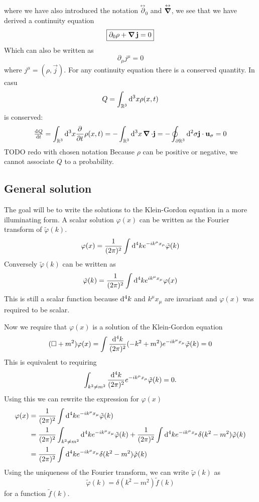 where we have also introduced the notation $\overset{\leftrightarrow}{\partial}_0$ and $\overset{\leftrightarrow}{\operatorname{\boldsymbol{\mathrm{\nabla}}}}$, we see that we have derived a continuity equation
\[ \boxed{\partial_0\rho + \operatorname{\boldsymbol{\mathrm{\nabla}}}\boldsymbol{\mathrm{j}}=0}\]
Which can also be written as
\[ \partial_\mu j^\mu =0 \]
where $j^\mu = (\rho,\vec{j})$. For any continuity equation there is a conserved quantity. In casu
\[ Q = \int_{\mathbb{R}^3}\operatorname{d \!}{^3x}\rho(x,t) \]
is conserved:
\[ \od{Q}{t} = \int_{\R^3} \diff{^3x}\pd{}{t}\rho(x,t) = -\int_{\R^3}\diff{^3x}\vnabla\cdot\vec{j} = - \oint_{\partial\R^3}\diff{^2\sigma} \vec{j}\cdot \vec{u}_\sigma = 0 \]
TODO redo with chosen notation
Because $\rho$ can be positive or negative, we cannot associate $Q$ to a probability.

\subsection{General solution}
The goal will be to write the solutions to the Klein-Gordon equation in a more illuminating form. A scalar solution $\varphi(x)$ can be written as the Fourier transform of $\tilde{\varphi}(k)$.
\[\varphi(x) = \frac{1}{(2\pi)^2} \int \operatorname{d \!}{^{4}k}e^{-ik^\mu x_\mu}\tilde{\varphi}(k)\]
Conversely $\tilde{\varphi}(k)$ can be written as
\[\tilde{\varphi}(k) = \frac{1}{(2\pi)^2} \int \operatorname{d \!}{^{4}k}e^{ik^\mu x_\mu}\varphi(x)\]
This is still a scalar function because $\operatorname{d \!}{^{4}k}$ and $k^\mu x_\mu$ are invariant and $\varphi(x)$ was required to be scalar.

Now we require that $\varphi(x)$ is a solution of the Klein-Gordon equation
\[(\Box + m^2)\varphi(x) = \int \frac{\operatorname{d \!}{^4k}}{(2\pi)^2} (-k^2 + m^2)e^{-ik^\mu x_\mu}\tilde{\varphi}(k) = 0 \]
This is equivalent to requiring
\[ \int_{k^2 \neq m^2} \frac{\operatorname{d \!}{^4k}}{(2\pi)^2}e^{-ik^\mu x_\mu}\tilde{\varphi}(k) = 0. \]
Using this we can rewrite the expression for $\varphi(x)$
\begin{align*}
\varphi(x) &= \frac{1}{(2\pi)^2} \int \operatorname{d \!}{^{4}k}e^{-ik^\mu x_\mu}\tilde{\varphi}(k) \\
&= \frac{1}{(2\pi)^2} \int_{k^2 \neq m^2} \operatorname{d \!}{^{4}k}e^{-ik^\mu x_\mu}\tilde{\varphi}(k) + \frac{1}{(2\pi)^2} \int \operatorname{d \!}{^{4}k}e^{-ik^\mu x_\mu}\delta(k^2-m^2)\tilde{\varphi}(k) \\
&= \frac{1}{(2\pi)^2} \int \operatorname{d \!}{^{4}k}e^{-ik^\mu x_\mu}\delta(k^2-m^2)\tilde{\varphi}(k)
\end{align*}
Using the uniqueness of the Fourier transform, we can write $\tilde{\varphi}(k)$ as
\[\tilde{\varphi}(k) = \delta(k^2-m^2)\tilde{f}(k)\]
for a function $\tilde{f}(k)$.

